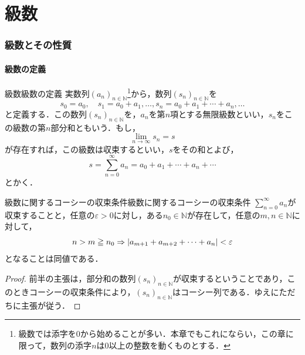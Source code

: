 \part{級数}

\begin{abstract}
この章では，数列の項を限りなく足し合わせた「級数」を導入し，その収束・発散を部分和の数列の極限（）として定義する．まず級数の収束に関するコーシーの収束条件を確認し，収束級数の一般項が $0$ に収束することを導く．次に，絶対収束の概念を導入し，絶対収束する級数は収束することを示す．そのうえで，級数の線型性や項のまとめ方に関する性質を確認する．最後に，各項が非負である正項級数を扱い，その収束判定に有効な比較定理を証明する．
\end{abstract}

\draftpart

\section{級数とその性質}

\subsection{級数の定義}

\begin{definition}{級数}{級数の定義}
  実数列$(a_n)_{n \in \mathbb{N}}$\footnote{級数では添字を$0$から始めることが多い．本章でもこれにならい，この章に限って，数列の添字$n$は$0$以上の整数を動くものとする．}から，数列$(s_n)_{n \in \mathbb{N}}$を
  \[
    s_0 =a_0 ,\quad s_1 =a_0+a_1,\ldots,s_n=a_0+a_1+\cdots+a_n,\ldots
  \]
  と定義する．この数列$(s_n)_{n \in \mathbb{N}}$を，$a_n$を第$n$項とする無限級数といい，$s_n$をこの級数の第$n$部分和ともいう．もし，
  \[
    \lim_{n \to \infty} s_n =s
  \]
  が存在すれば，この級数は収束するといい，$s$をその和とよび，
  \[
    s=\sum_{n=0}^{\infty} a_n =a_0+a_1+\cdots+a_n+\cdots
  \]
  とかく．
\end{definition}

\begin{theorem}{級数に関するコーシーの収束条件}{級数に関するコーシーの収束条件}
  $\sum_{n=0}^{\infty} a_n$が収束することと，任意の$\varepsilon>0$に対し，ある$n_0 \in \mathbb{N}$が存在して，任意の$m,n \in \mathbb{N}$に対して，
  \[
    n > m \geqq n_0 \mathrel{\Rightarrow} \lvert a_{m+1}+a_{m+2}+\cdots+a_{n}\rvert<\varepsilon
  \]
  となることは同値である．
\end{theorem}

\begin{leftbar}
  \begin{proof}
    前半の主張は，部分和の数列$(s_n)_{n \in \mathbb{N}}$が収束するということであり，このときコーシーの収束条件により，$(s_n)_{n \in \mathbb{N}}$はコーシー列である．ゆえにただちに主張が従う．
  \end{proof}
\end{leftbar}

